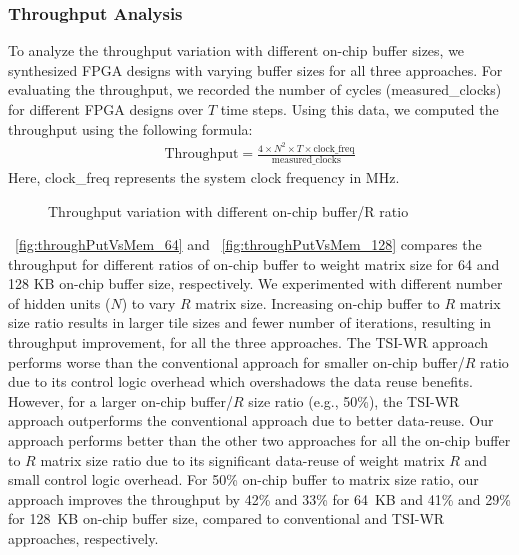 {{{{\subsubsection{Throughput Analysis}
To analyze the throughput variation with different on-chip buffer sizes, we synthesized FPGA designs with varying buffer sizes for all three approaches. For evaluating the throughput, we recorded the number of cycles (measured\_clocks) for different FPGA designs over $T$ time steps. Using this data, we computed the throughput using the following formula:
\begin{align}\label{eq:througput}
	\text{Throughput}=\frac{4{\times}N^2{\times}T{\times}{\text {clock\_freq}}}{\text{measured\_clocks}}
\end{align}
Here, clock\_freq represents the system clock frequency in MHz.
\begin{figure}[htb!]
	\centering
	\hspace{2.0em}
	\caption{Throughput variation with different on-chip buffer/R ratio}	\label{fig:throughputVsMem}
\end{figure}
\figurename{~\ref{fig:throughPutVsMem_64}} and \figurename{~\ref{fig:throughPutVsMem_128}} compares the throughput for different ratios of on-chip buffer to weight matrix size for 64 and 128 KB on-chip buffer size, respectively.  We experimented with different number of hidden units ($N$) to vary $R$ matrix size. Increasing on-chip buffer to $R$ matrix size ratio results in larger tile sizes and fewer number of iterations, resulting in throughput improvement, for all the three approaches. The TSI-WR approach performs worse than the conventional approach for smaller on-chip buffer/$R$ ratio due to its control logic overhead which overshadows the data reuse benefits. However, for a larger on-chip buffer/$R$ size ratio (e.g., 50\%), the TSI-WR approach outperforms the conventional approach due to better data-reuse. Our approach performs better than the other two approaches for all the on-chip buffer to $R$ matrix size ratio due to its significant data-reuse of weight matrix $R$ and small control logic overhead.
For 50\% on-chip buffer to matrix size ratio, our approach improves the throughput by 42\% and 33\% for 64~KB and 41\% and 29\% for 128~KB on-chip buffer size, compared to conventional and TSI-WR approaches, respectively.
}}}}
